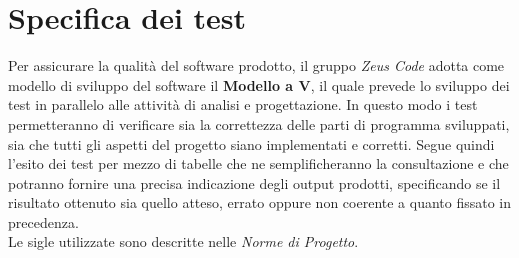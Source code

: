 \section{Specifica dei test}
Per assicurare la qualità del software prodotto, il gruppo \textit{Zeus Code} adotta come modello di sviluppo del software il
\textbf{Modello a V\glo}, il quale prevede lo sviluppo dei test in parallelo alle
attività di analisi e progettazione. In questo modo i test permetteranno di
verificare sia la correttezza delle parti di programma sviluppati, sia che
tutti gli aspetti del progetto siano implementati e corretti. 
Segue quindi l'esito dei test per mezzo di tabelle che ne
semplificheranno la consultazione e che potranno fornire una precisa indicazione 
degli output prodotti, specificando se il risultato ottenuto sia quello atteso, errato
oppure non coerente a quanto fissato in precedenza. \\
Le sigle utilizzate sono descritte nelle \textit{Norme di Progetto}.


	\renewcommand{\arraystretch}{1.5}
	
